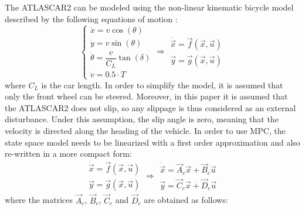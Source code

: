 The ATLASCAR2 can be modeled using the non-linear kinematic bicycle model described by the following equations of motion \cite{safety} \cite{swarms}:
\begin{equation}
\label{eqn:dynamics_model_obstacle_avoidance}
\left \{ \begin{array}{llll}
\dot{x} = v\cos(\theta)\\
\dot{y} = v\sin(\theta)\\
\dot{\theta} =\dfrac{v}{C_L}\tan(\delta)\\
\dot{v} =0.5 \cdot T
\end{array} 
\right .
\Longrightarrow 
\begin{array}{llll}
\dot{\vec{x}} = \vec{f}(\vec{x},\vec{u})\\
\vec{y} = \vec{g}(\vec{x},\vec{u})
\end{array}
\end{equation}
where $C_L$ is the car length. In order to simplify the model, it is assumed that only the front wheel can be steered. Moreover, in this paper it is assumed that the ATLASCAR2 does not slip, so any slippage is thus considered as an external disturbance. Under this assumption, the slip angle is zero, meaning that the velocity is directed along the heading of the vehicle. In order to use MPC, the state space model needs to be linearized with a first order approximation and also re-written in a more compact form:
\begin{equation}
\label{eqn:dynamics_model_non_linear}
\begin{array}{llll}
\dot{\vec{x}} = \vec{f}(\vec{x},\vec{u})\\
\vec{y} = \vec{g}(\vec{x},\vec{u})
\end{array} \Longrightarrow
\begin{array}{ll}
\dot{\vec{x}} =\vec{A}_c \vec{x}+ \vec{B}_c \vec{u}\\
\vec{y} =\vec{C}_c \vec{x} + \vec{D}_c \vec{u}
\end{array}
\end{equation}
where the matrices $\vec{A}_c$, $\vec{B}_c$, $\vec{C}_c$ and $\vec{D}_c$ are obtained as follows:
